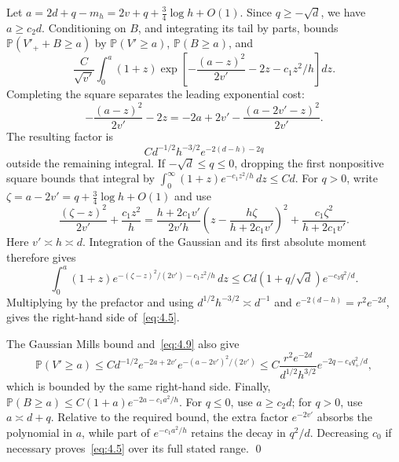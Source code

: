 \documentclass[11pt,letterpaper,reqno]{amsart}
\numberwithin{equation}{section}
\theoremstyle{remark}
\begin{document}
Let $a=2d+q-m_h=2v+q+\tfrac34\log h+O(1)$. Since $q\ge-\sqrt d$, we have $a\ge c_2d$. Conditioning on $B$, and integrating its tail by parts, bounds
$\mathbb P(V'_++B\ge a)$ by $\mathbb P(V'\ge a)$, $\mathbb P(B\ge a)$, and
\begin{equation}\label{eq:4.8}
\frac C{\sqrt{v'}}\int_0^a(1+z)
\exp\left[-\frac{(a-z)^2}{2v'}-2z-c_1z^2/h\right]dz.
\end{equation}
Completing the square separates the leading exponential cost:
\begin{equation}\label{eq:4.9}
-\frac{(a-z)^2}{2v'}-2z
=-2a+2v'-\frac{(a-2v'-z)^2}{2v'}.
\end{equation}
The resulting factor is
\[
C d^{-1/2}h^{-3/2}e^{-2(d-h)-2q}
\]
outside the remaining integral. If $-\sqrt d\le q\le0$, dropping the first nonpositive square bounds that integral by
$\int_0^\infty(1+z)e^{-c_1z^2/h}\,dz\le Cd$.
For $q>0$, write $\zeta=a-2v'=q+\tfrac34\log h+O(1)$ and use
\begin{equation}\label{eq:terminal-double-square}
\frac{(\zeta-z)^2}{2v'}+\frac{c_1z^2}{h}
=\frac{h+2c_1v'}{2v'h}
 \left(z-\frac{h\zeta}{h+2c_1v'}\right)^2
 +\frac{c_1\zeta^2}{h+2c_1v'}.
\end{equation}
Here $v'\asymp h\asymp d$. Integration of the Gaussian and its first absolute moment therefore gives
\[
\int_0^a(1+z)
 e^{-(\zeta-z)^2/(2v')-c_1z^2/h}\,dz
\le Cd(1+q/\sqrt d)e^{-c_3q^2/d}.
\]
Multiplying by the prefactor and using
$d^{1/2}h^{-3/2}\asymp d^{-1}$ and
$e^{-2(d-h)}=r^2e^{-2d}$, gives the right-hand side of~\eqref{eq:4.5}.

The Gaussian Mills bound and~\eqref{eq:4.9} also give
\[
\mathbb P(V'\ge a)
\le C d^{-1/2}e^{-2a+2v'}
 e^{-(a-2v')^2/(2v')}
\le C\frac{r^2e^{-2d}}{d^{1/2}h^{3/2}}
 e^{-2q-c_4q_+^2/d},
\]
which is bounded by the same right-hand side. Finally,
$\mathbb P(B\ge a)\le C(1+a)e^{-2a-c_1a^2/h}$.
For $q\le0$, use $a\ge c_2d$; for $q>0$, use $a\asymp d+q$. Relative to the required bound, the extra factor $e^{-2v'}$ absorbs the polynomial in $a$, while part of $e^{-c_1a^2/h}$ retains the decay in $q^2/d$. Decreasing $c_0$ if necessary proves~\eqref{eq:4.5} over its full stated range.
\qed
\end{document}
